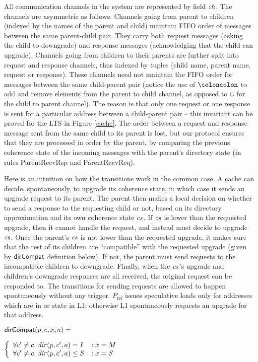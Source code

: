 All communication channels in the system are represented by field $\mathit{ch}$.  The
channels are asymmetric as follows. Channels going from parent to children
(indexed by the names of the parent and child) maintain FIFO order of messages
between the same parent-child pair. They carry both request messages (asking
the child to downgrade) and response messages (acknowledging that the child can
upgrade). Channels going from children to their parents are further split into
request and response channels, thus indexed by tuples (child name, parent name,
request or response).  These channels need not maintain the FIFO order for
messages between the same child-parent pair (notice the use of $\coloncolon$ to
add and remove elements from the parent to child channel, as opposed to
$\uplus$ for the child to parent channel). The reason is that only one request
or one response is sent for a particular address between a child-parent pair --
this invariant can be proved for the LTS in  Figure \ref{cache}. The order
between a request and response message sent from the same child to its parent
is lost, but our protocol ensures that they are processed in order by the parent, by
comparing the previous coherence state of the incoming messages with the
parent's directory state (in rules ParentRecvRsp
and ParentRecvReq).

Here is an intuition on how the transitions work in the common case.  A cache
can decide, spontaneously, to upgrade its coherence state, in which case it
sends an upgrade request to its parent. The parent then makes a local decision
on whether to send a response to the requesting child or not, based on its
directory approximation and its own coherence state $\mathit{cs}$. If $\mathit{cs}$ is lower than
the requested upgrade, then it cannot handle the request, and instead must
decide to upgrade $\mathit{cs}$.  Once the parent's $\mathit{cs}$ is not lower than the requested
upgrade, it makes sure that the rest of its children are ``compatible'' with
the requested upgrade (given by $\mathsf{dirCompat}$ definition below).  If not, the
parent must send requests to the incompatible children to downgrade. Finally, when
the $\mathit{cs}$'s upgrade and children's downgrade responses are all received, the
original request can be responded to. The transitions for sending requests are
allowed to happen spontaneously without any trigger. $P_\text{ref}$ issues speculative
loads only for addresses which are in \Sh{} or \Mo{} state in L1; otherwise L1
spontaneously requests an upgrade for that address.

\begin{defn}
$\mathsf{dirCompat}(p, c, x, a) =$

\begin{math}
\left\{
\begin{array}{ll}
\forall c' \neq c. \; \mathit{dir}(p,c',a) = I &: x = M\\
\forall c' \neq c. \; \mathit{dir}(p,c',a) \le S &: x = S\\
\end{array}
\right.
\end{math}
\end{defn}


